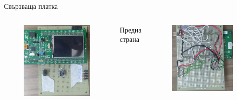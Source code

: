 \documentclass[handout]{beamer}
\begin{document}
\begin{frame}{Свързваща платка}
		\begin{columns}
		\begin{figure}[htpb!]
			\centering
			\includegraphics[width=1\textwidth]{Images/pcb2.png}
		\end{figure}

		Предна страна 
		\begin{figure}[htpb!]
			\centering
			\includegraphics[width=1\textwidth]{Images/pcb1.png}
		\end{figure}


\end{columns}
\end{frame}
\end{document}
